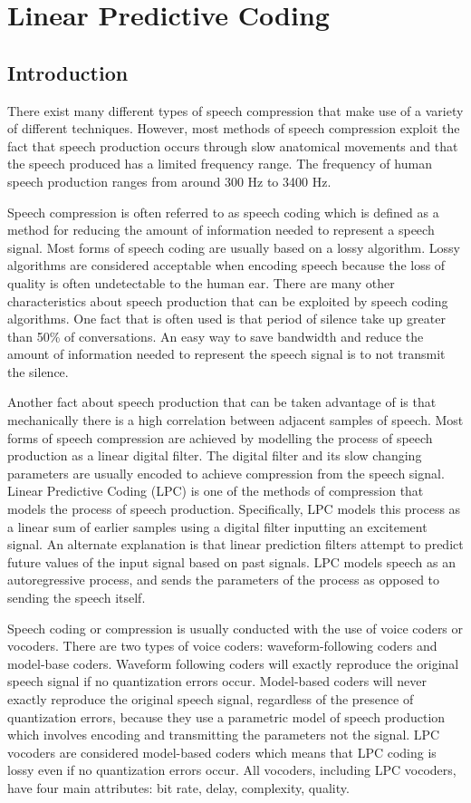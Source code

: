 \documentclass[12pt, a4paper, twoside]{report}
\begin{document}
\section{Linear Predictive Coding}
\subsection{Introduction}
There exist many different types of speech compression that make use of a variety of different techniques. However, most methods of speech compression exploit the fact that speech production occurs through slow anatomical movements and that the speech produced has a limited frequency range. The frequency of human speech production ranges from around 300 Hz to 3400 Hz.

Speech compression is often referred to as speech coding which is defined as a method for reducing the amount of information needed to represent a speech signal. Most forms of speech coding are usually based on a lossy algorithm. Lossy algorithms are considered acceptable when encoding speech because the loss of quality is often undetectable to the human ear. There are many other characteristics about speech production that can be exploited by speech coding algorithms. One fact that is often used is that period of silence take up greater than 50\% of conversations. An easy way to save bandwidth and reduce the amount of information needed to represent the speech signal is to not transmit the silence.

Another fact about speech production that can be taken advantage of is that mechanically there is a high correlation between adjacent samples of speech. Most forms of speech compression are achieved by modelling the process of speech production as a linear digital filter. The digital filter and its slow changing parameters are usually encoded to achieve compression from the speech signal. Linear Predictive Coding (LPC) is one of the methods of compression that models the process of speech production. Specifically, LPC models this process as a linear sum of earlier samples using a digital filter inputting an excitement signal. An alternate explanation is that linear prediction filters attempt to predict future values of the input signal based on past signals. LPC models speech as an autoregressive process, and sends the parameters of the process as opposed to sending the speech itself.

Speech coding or compression is usually conducted with the use of voice coders or vocoders. There are two types of voice coders: waveform-following coders and model-base coders. Waveform following coders will exactly reproduce the original speech signal if no quantization errors occur. Model-based coders will never exactly reproduce the original speech signal, regardless of the presence of quantization errors, because they use a parametric model of speech production which involves encoding and transmitting the parameters not the signal. LPC vocoders are considered model-based coders which means that LPC coding is lossy even if no quantization errors occur. All vocoders, including LPC vocoders, have four main attributes: bit rate, delay, complexity, quality.
\end{document}
